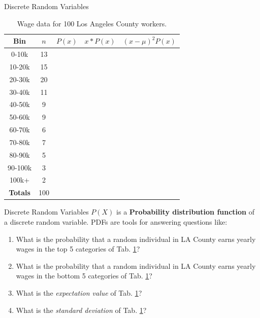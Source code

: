 \documentclass{beamer}
\begin{document}
\begin{frame}{Discrete Random Variables}
\small
\begin{table}
\centering
\begin{tabular}{| c | c | c | c | c |}
\hline
\hline
Bin & $n$ & $P(x)$ & $x*P(x)$ & $(x-\mu)^2 P(x)$ \\ \hline
0-10k & 13 & & & \\ \hline
10-20k & 15 & & & \\ \hline
20-30k & 20 & & & \\ \hline
30-40k & 11 & & & \\ \hline
40-50k & 9 & & & \\ \hline
50-60k & 9 & & & \\ \hline
60-70k & 6 & & & \\ \hline
70-80k & 7 & & & \\ \hline
80-90k & 5 & & & \\ \hline
90-100k & 3 & & & \\ \hline
100k+ & 2 & & & \\ \hline
\textbf{Totals} & 100 & & & \\ \hline
\hline
\end{tabular}
\caption{\label{tab:wages} Wage data for 100 Los Angeles County workers.}
\end{table}
\end{frame}

\begin{frame}{Discrete Random Variables}
\small
$P(X)$ is a \alert{\textbf{Probability distribution function}} of a discrete random variable.
PDFs are tools for answering questions like:
\begin{enumerate}
\item What is the probability that a random individual in LA County earns yearly wages in the top 5 categories of Tab. \ref{tab:wages}?
\item What is the probability that a random individual in LA County earns yearly wages in the bottom 5 categories of Tab. \ref{tab:wages}?
\item What is the \textit{expectation value} of Tab. \ref{tab:wages}?
\item What is the \textit{standard deviation} of Tab. \ref{tab:wages}?
\end{enumerate}
\end{frame}
\end{document}
